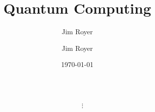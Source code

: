 \documentclass[table,serif,ignorenonframetext,xcolor=dvipsnames]{beamer}
\title{Quantum Computing}
\author[Royer]{Jim Royer}
\date{\today}
\institute[CIS 428/628]{\emph{CIS 428/628: Introduction to Cryptography}}
\author[Crypto]{Jim Royer}
\begin{document}
\begin{frame}



\begin{columns}
\begin{column}{.48\textwidth}
\maketitle
\end{column}
\begin{column}{.48\textwidth}\centering

\vspace*{3ex}


$\vdots$

\end{column}
\end{columns}

\end{frame}
\end{document}
